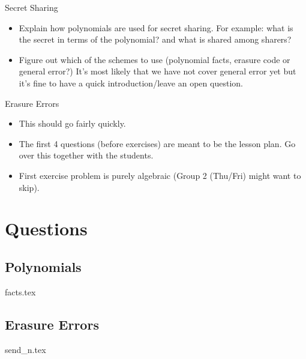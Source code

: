 \documentclass{exam}
\begin{document}
\begin{questions}
	\item Secret Sharing
	\begin{itemize}
		\item Explain how polynomials are used for secret sharing. For example: what is the secret in terms of the polynomial? and what is shared among sharers?
		\item Figure out which of the schemes to use (polynomial facts, erasure code or general error?) It's most likely that we have not cover general error yet but it's fine to have a quick introduction/leave an open question.
	\end{itemize}


	\item Erasure Errors
	\begin{itemize}
		\item This should go fairly quickly.
		\item The first 4 questions (before exercises) are meant to be the lesson plan. Go over this together with the students.
		\item First exercise problem is purely algebraic (Group 2 (Thu/Fri) might want to skip).
	\end{itemize}

\end{questions}


\section{Questions}
\subsection{Polynomials}
\begin{enumerate}
{facts.tex}
\end{enumerate}

\subsection{Erasure Errors}
\begin{enumerate}
{send_n.tex}
\end{enumerate}
\end{document}
